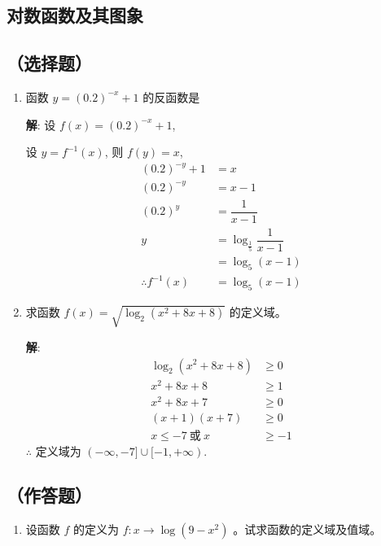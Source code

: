 \documentclass{report}
\newcommand{\sol}{\vspace{0.2cm}\textbf{解}:}
\begin{document}
\begin{multicols*}{2}
    \newpage
    \section{对数函数及其图象}

    \subsection*{（选择题）}
    \begin{enumerate}[leftmargin=*]
        \item 函数 $y=(0.2)^{-x}+1$ 的反函数是

              \sol{}
              设 $f(x) = (0.2)^{-x} + 1$,

              设 $y = f^{-1}(x)$, 则 $f(y) = x$,
              \begin{align*}
                  (0.2)^{-y} + 1       & = x                                   \\
                  (0.2)^{-y}           & = x - 1                               \\
                  (0.2)^y              & = \dfrac{1}{x - 1}                    \\
                  y                    & = \log_{\frac{1}{5}} \dfrac{1}{x - 1} \\
                                       & = \log_5 (x - 1)                      \\
                  \therefore f^{-1}(x) & = \log_5 (x - 1)
              \end{align*}

        \item 求函数 $f(x)=\sqrt{\log _2\left(x^2+8 x+8\right)}$ 的定义域。

              \sol{}
              \begin{align*}
                  \log_2(x^2 + 8x + 8)    & \geq 0  \\
                  x^2 + 8x + 8            & \geq 1  \\
                  x^2 + 8x + 7            & \geq 0  \\
                  (x + 1)(x + 7)          & \geq 0  \\
                  x \leq -7 \ \text{或}\ x & \geq -1
              \end{align*}
              $\therefore$ 定义域为 $(-\infty, -7] \cup [-1, +\infty)$.
    \end{enumerate}

    \subsection*{（作答题）}
    \begin{enumerate}[leftmargin=*]
        \item 设函数 $f$ 的定义为 $f: x \rightarrow \log \left(9-x^2\right)$ 。试求函数的定义域及值域。


\end{enumerate}
\end{multicols*}
\end{document}
